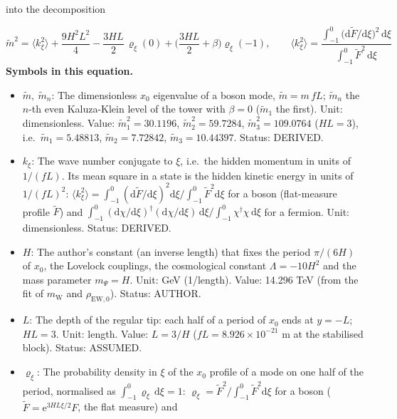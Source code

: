 \documentclass[
  10pt,
]{article}
\providecommand{\tightlist}{%
  \setlength{\itemsep}{0pt}\setlength{\parskip}{0pt}}
\begin{document}
into the decomposition

\[ \tilde m^2 = \langle k_\xi^2\rangle + \frac{9H^2L^2}{4} - \frac{3HL}{2}\,\varrho_\xi(0) + \Big(\frac{3HL}{2} + \beta\Big)\varrho_\xi(-1),\qquad \langle k_\xi^2\rangle = \frac{\int_{-1}^{0}\big(\mathrm{d}\tilde F/\mathrm{d}\xi\big)^2\,\mathrm{d}\xi}{\int_{-1}^{0}\tilde F^2\,\mathrm{d}\xi} \]
\textbf{Symbols in this equation.}

\begin{itemize}
\tightlist
\item
  \(\tilde m,\ \tilde m_n\): The dimensionless \(x_0\) eigenvalue of a
  boson mode, \(\tilde m = m\,fL\); \(\tilde m_n\) the \(n\)-th even
  Kaluza-Klein level of the tower with \(\beta = 0\) (\(\tilde m_1\) the
  first). Unit: dimensionless. Value: \(\tilde m_1^2 = 30.1196\),
  \(\tilde m_2^2 = 59.7284\), \(\tilde m_3^2 = 109.0764\) (\(HL = 3\)),
  i.e.~\(\tilde m_1 = 5.48813\), \(\tilde m_2 = 7.72842\),
  \(\tilde m_3 = 10.44397\). Status: DERIVED.
\item
  \(k_\xi\): The wave number conjugate to \(\xi\), i.e.~the hidden
  momentum in units of \(1/(fL)\). Its mean square in a state is the
  hidden kinetic energy in units of \(1/(fL)^2\):
  \(\langle k_\xi^2\rangle = \int_{-1}^{0}(\mathrm{d}\tilde F/\mathrm{d}\xi)^2\mathrm{d}\xi\big/\int_{-1}^{0}\tilde F^2\mathrm{d}\xi\)
  for a boson (flat-measure profile \(\tilde F\)) and
  \(\int_{-1}^{0}(\mathrm{d}\chi/\mathrm{d}\xi)^\dagger(\mathrm{d}\chi/\mathrm{d}\xi)\,\mathrm{d}\xi\big/\int_{-1}^{0}\chi^\dagger\chi\,\mathrm{d}\xi\)
  for a fermion. Unit: dimensionless. Status: DERIVED.
\item
  \(H\): The author's constant (an inverse length) that fixes the period
  \(\pi/(6H)\) of \(x_0\), the Lovelock couplings, the cosmological
  constant \(\Lambda = -10H^2\) and the mass parameter \(m_\Psi = H\).
  Unit: GeV (1/length). Value: 14.296 TeV (from the fit of
  \(m_{\mathrm{W}}\) and \(\rho_{\mathrm{EW},0}\)). Status: AUTHOR.
\item
  \(L\): The depth of the regular tip: each half of a period of \(x_0\)
  ends at \(y = -L\); \(HL = 3\). Unit: length. Value: \(L = 3/H\)
  (\(fL = 8.926\times10^{-21}\) m at the stabilised block). Status:
  ASSUMED.
\item
  \(\varrho_\xi\): The probability density in \(\xi\) of the \(x_0\)
  profile of a mode on one half of the period, normalised as
  \(\int_{-1}^{0}\varrho_\xi\,\mathrm{d}\xi = 1\):
  \(\varrho_\xi = \tilde F^2/\int_{-1}^{0}\tilde F^2\mathrm{d}\xi\) for
  a boson (\(\tilde F = \mathrm{e}^{3HL\xi/2}F\), the flat measure) and

\end{itemize}
\end{document}
